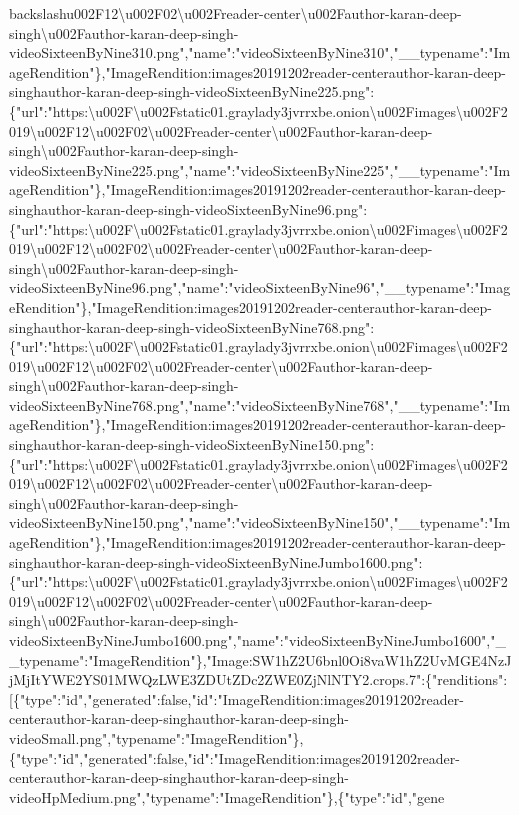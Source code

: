 backslash{}u002F12\textbackslash{}u002F02\textbackslash{}u002Freader-center\textbackslash{}u002Fauthor-karan-deep-singh\textbackslash{}u002Fauthor-karan-deep-singh-videoSixteenByNine310.png","name":"videoSixteenByNine310","\_\_typename":"ImageRendition"\},"ImageRendition:images20191202reader-centerauthor-karan-deep-singhauthor-karan-deep-singh-videoSixteenByNine225.png":\{"url":"https:\textbackslash{}u002F\textbackslash{}u002Fstatic01.graylady3jvrrxbe.onion\textbackslash{}u002Fimages\textbackslash{}u002F2019\textbackslash{}u002F12\textbackslash{}u002F02\textbackslash{}u002Freader-center\textbackslash{}u002Fauthor-karan-deep-singh\textbackslash{}u002Fauthor-karan-deep-singh-videoSixteenByNine225.png","name":"videoSixteenByNine225","\_\_typename":"ImageRendition"\},"ImageRendition:images20191202reader-centerauthor-karan-deep-singhauthor-karan-deep-singh-videoSixteenByNine96.png":\{"url":"https:\textbackslash{}u002F\textbackslash{}u002Fstatic01.graylady3jvrrxbe.onion\textbackslash{}u002Fimages\textbackslash{}u002F2019\textbackslash{}u002F12\textbackslash{}u002F02\textbackslash{}u002Freader-center\textbackslash{}u002Fauthor-karan-deep-singh\textbackslash{}u002Fauthor-karan-deep-singh-videoSixteenByNine96.png","name":"videoSixteenByNine96","\_\_typename":"ImageRendition"\},"ImageRendition:images20191202reader-centerauthor-karan-deep-singhauthor-karan-deep-singh-videoSixteenByNine768.png":\{"url":"https:\textbackslash{}u002F\textbackslash{}u002Fstatic01.graylady3jvrrxbe.onion\textbackslash{}u002Fimages\textbackslash{}u002F2019\textbackslash{}u002F12\textbackslash{}u002F02\textbackslash{}u002Freader-center\textbackslash{}u002Fauthor-karan-deep-singh\textbackslash{}u002Fauthor-karan-deep-singh-videoSixteenByNine768.png","name":"videoSixteenByNine768","\_\_typename":"ImageRendition"\},"ImageRendition:images20191202reader-centerauthor-karan-deep-singhauthor-karan-deep-singh-videoSixteenByNine150.png":\{"url":"https:\textbackslash{}u002F\textbackslash{}u002Fstatic01.graylady3jvrrxbe.onion\textbackslash{}u002Fimages\textbackslash{}u002F2019\textbackslash{}u002F12\textbackslash{}u002F02\textbackslash{}u002Freader-center\textbackslash{}u002Fauthor-karan-deep-singh\textbackslash{}u002Fauthor-karan-deep-singh-videoSixteenByNine150.png","name":"videoSixteenByNine150","\_\_typename":"ImageRendition"\},"ImageRendition:images20191202reader-centerauthor-karan-deep-singhauthor-karan-deep-singh-videoSixteenByNineJumbo1600.png":\{"url":"https:\textbackslash{}u002F\textbackslash{}u002Fstatic01.graylady3jvrrxbe.onion\textbackslash{}u002Fimages\textbackslash{}u002F2019\textbackslash{}u002F12\textbackslash{}u002F02\textbackslash{}u002Freader-center\textbackslash{}u002Fauthor-karan-deep-singh\textbackslash{}u002Fauthor-karan-deep-singh-videoSixteenByNineJumbo1600.png","name":"videoSixteenByNineJumbo1600","\_\_typename":"ImageRendition"\},"Image:SW1hZ2U6bnl0Oi8vaW1hZ2UvMGE4NzJjMjItYWE2YS01MWQzLWE3ZDUtZDc2ZWE0ZjNlNTY2.crops.7":\{"renditions":{[}\{"type":"id","generated":false,"id":"ImageRendition:images20191202reader-centerauthor-karan-deep-singhauthor-karan-deep-singh-videoSmall.png","typename":"ImageRendition"\},\{"type":"id","generated":false,"id":"ImageRendition:images20191202reader-centerauthor-karan-deep-singhauthor-karan-deep-singh-videoHpMedium.png","typename":"ImageRendition"\},\{"type":"id","gene